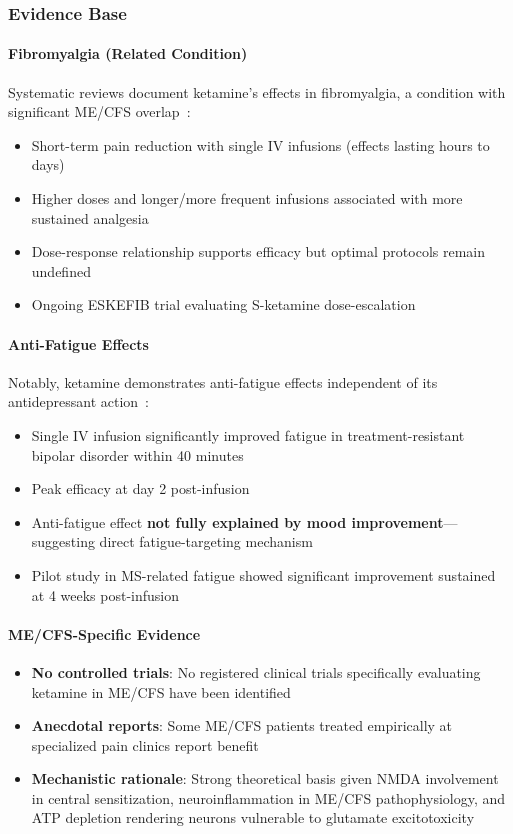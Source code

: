 \subsubsection{Evidence Base}

\paragraph{Fibromyalgia (Related Condition)}
Systematic reviews document ketamine's effects in fibromyalgia, a condition with significant ME/CFS overlap~\cite{Walitt2021KetamineFibro,Pacheco2024KetamineFibro}:
\begin{itemize}
    \item Short-term pain reduction with single IV infusions (effects lasting hours to days)
    \item Higher doses and longer/more frequent infusions associated with more sustained analgesia
    \item Dose-response relationship supports efficacy but optimal protocols remain undefined
    \item Ongoing ESKEFIB trial evaluating S-ketamine dose-escalation~\cite{ESKEFIB2021Protocol}
\end{itemize}

\paragraph{Anti-Fatigue Effects}
Notably, ketamine demonstrates anti-fatigue effects independent of its antidepressant action~\cite{McIntyre2015KetamineFatigue}:
\begin{itemize}
    \item Single IV infusion significantly improved fatigue in treatment-resistant bipolar disorder within 40 minutes
    \item Peak efficacy at day 2 post-infusion
    \item Anti-fatigue effect \textbf{not fully explained by mood improvement}---suggesting direct fatigue-targeting mechanism
    \item Pilot study in MS-related fatigue showed significant improvement sustained at 4 weeks post-infusion
\end{itemize}

\paragraph{ME/CFS-Specific Evidence}
\begin{itemize}
    \item \textbf{No controlled trials}: No registered clinical trials specifically evaluating ketamine in ME/CFS have been identified
    \item \textbf{Anecdotal reports}: Some ME/CFS patients treated empirically at specialized pain clinics report benefit
    \item \textbf{Mechanistic rationale}: Strong theoretical basis given NMDA involvement in central sensitization, neuroinflammation in ME/CFS pathophysiology, and ATP depletion rendering neurons vulnerable to glutamate excitotoxicity
\end{itemize}

